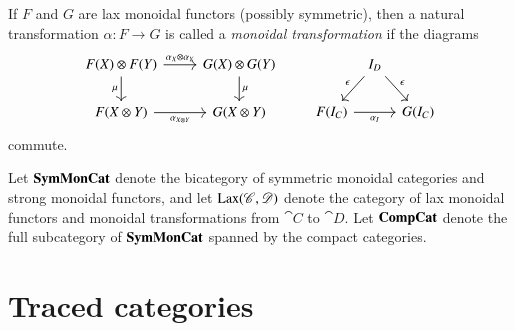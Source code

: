 \documentclass[12pt,oneside,article,draft]{memoir}
\begin{document}
\begin{enumerate}
If $F$ and $G$ are lax monoidal functors (possibly symmetric), then a natural transformation $\alpha\colon F\to G$ is called a \emph{monoidal transformation} if the diagrams
\[
\begin{tikzcd}
	F(X)\otimes F(Y)
		\rar{\alpha_X\otimes\alpha_Y}
		\dar[swap]{\mu}
	& G(X)\otimes G(Y)
		\dar{\mu} \\
	F(X\otimes Y)
		\rar[swap]{\alpha_{X\otimes Y}}
	& G(X\otimes Y)
\end{tikzcd}
\qquad
\begin{tikzcd}[column sep=tiny]
	{} & I_D \dlar[swap]{\epsilon} \drar{\epsilon} & \\
	F(I_C) \ar{rr}[swap]{\alpha_I} && G(I_C)
\end{tikzcd}
\]
commute.

Let $\mathbf{SymMonCat}$ denote the bicategory of symmetric monoidal categories and strong monoidal functors, and let $\operatorname{Lax}(\mathscr{C},\mathscr{D})$ denote the category of lax monoidal functors and monoidal transformations from $\cat{C}$ to $\cat{D}$.
Let $\mathbf{CompCat}$ denote the full subcategory of $\mathbf{SymMonCat}$ spanned by the compact categories.

\section{Traced categories}\label{sec:intuition for traced}


\end{enumerate}
\end{document}
